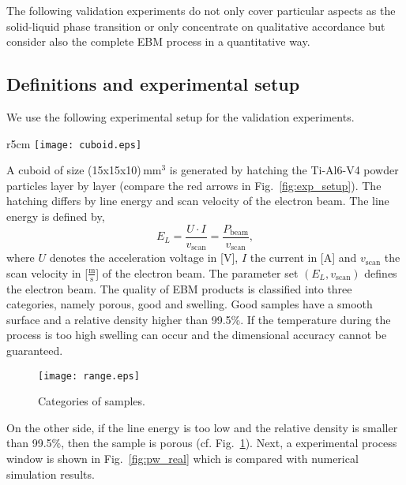 The following validation experiments do not only cover particular aspects as the solid-liquid phase transition or only concentrate 
on qualitative accordance but consider also the complete EBM process in a quantitative way. 
\subsection{Definitions and experimental setup}
We use the following experimental setup for the validation experiments. 
\begin{wrapfigure}{r}{5cm}
\centering
\vspace{-13pt}
\texttt{[image: cuboid.eps]}
\caption{Experimental setup.}
\label{fig:exp_setup}
\end{wrapfigure}
A cuboid of size (15x15x10)\,mm$^{3}$ is generated by hatching the Ti-Al6-V4 powder particles layer by layer (compare the red arrows in Fig.~\ref{fig:exp_setup}).
The hatching differs by line energy and scan velocity of the electron beam. The line energy is defined by,
\begin{equation}
 E_{L} = \frac{U\cdot I}{v_{\text{scan}}} = \frac{P_{\text{beam}}}{v_{\text{scan}}},
\label{eq:line_energy}
\end{equation}
where $U$ denotes the acceleration voltage in [V], $I$ the current in [A] and $v_{\text{scan}}$ the scan velocity in [$\frac{\text{m}}{\text{s}}$] of the electron beam. 
The parameter set $(E_{L},v_{\text{scan}})$ defines the electron beam. 
The quality of EBM products is classified into three categories, namely porous, good and swelling. Good samples have a smooth surface and 
a relative density higher than 99.5\%. If the temperature during the process is too high swelling can occur and the dimensional accuracy cannot be guaranteed. 
\begin{figure}[htbp!]
\centering
\texttt{[image: range.eps]}
\caption{Categories of samples.}
\label{fig:categories}
\end{figure}
On the other side, if the line energy is too low and the relative density is smaller than
99.5\%, then the sample is porous (cf. Fig.~\ref{fig:categories}). 
Next, a experimental process window is shown in Fig.~\ref{fig:pw_real} which is compared with numerical simulation results. 

